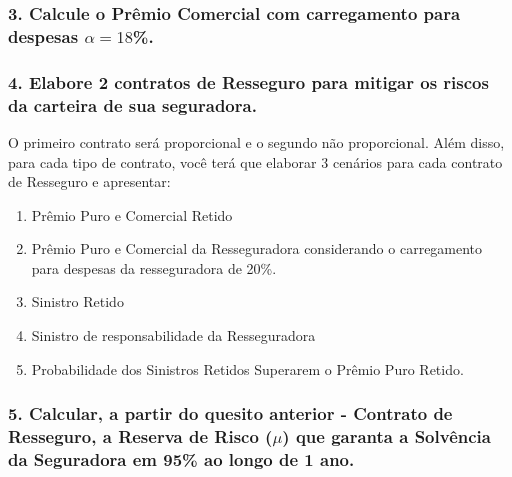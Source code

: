 \documentclass[]{article}
\begin{document}
\hypertarget{calcule-o-premio-comercial-com-carregamento-para-despesas-alpha-18.}{%
\subsubsection{\texorpdfstring{3. Calcule o Prêmio Comercial com
carregamento para despesas
\(\alpha = 18\)\%.}{3. Calcule o Prêmio Comercial com carregamento para despesas \textbackslash{}alpha = 18\%.}}\label{calcule-o-premio-comercial-com-carregamento-para-despesas-alpha-18.}}

\hypertarget{elabore-2-contratos-de-resseguro-para-mitigar-os-riscos-da-carteira-de-sua-seguradora.}{%
\subsubsection{4. Elabore 2 contratos de Resseguro para mitigar os
riscos da carteira de sua
seguradora.}\label{elabore-2-contratos-de-resseguro-para-mitigar-os-riscos-da-carteira-de-sua-seguradora.}}

O primeiro contrato será proporcional e o segundo não proporcional. Além
disso, para cada tipo de contrato, você terá que elaborar 3 cenários
para cada contrato de Resseguro e apresentar:

\begin{enumerate}
\def\labelenumi{\alph{enumi})}
\item
  Prêmio Puro e Comercial Retido
\item
  Prêmio Puro e Comercial da Resseguradora considerando o carregamento
  para despesas da resseguradora de 20\%.
\item
  Sinistro Retido
\item
  Sinistro de responsabilidade da Resseguradora
\item
  Probabilidade dos Sinistros Retidos Superarem o Prêmio Puro Retido.
\end{enumerate}

\hypertarget{calcular-a-partir-do-quesito-anterior---contrato-de-resseguro-a-reserva-de-risco-mu-que-garanta-a-solvencia-da-seguradora-em-95-ao-longo-de-1-ano.}{%
\subsubsection{\texorpdfstring{5. Calcular, a partir do quesito anterior
- Contrato de Resseguro, a Reserva de Risco (\(\mu\)) que garanta a
Solvência da Seguradora em 95\% ao longo de 1
ano.}{5. Calcular, a partir do quesito anterior - Contrato de Resseguro, a Reserva de Risco (\textbackslash{}mu) que garanta a Solvência da Seguradora em 95\% ao longo de 1 ano.}}\label{calcular-a-partir-do-quesito-anterior---contrato-de-resseguro-a-reserva-de-risco-mu-que-garanta-a-solvencia-da-seguradora-em-95-ao-longo-de-1-ano.}}
\end{document}

